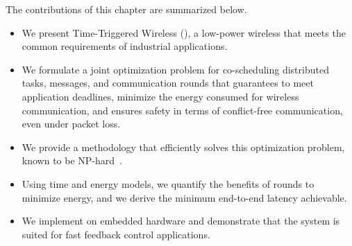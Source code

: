 The contributions of this chapter are summarized below.
\begin{itemize}

  \item
  We present Time-Triggered Wireless (\TTW), a low-power wireless \CPS that meets the common requirements of industrial applications.

  \item
  We formulate a joint optimization problem for co-scheduling distributed tasks, messages, and communication rounds that guarantees to meet application deadlines, minimize the energy consumed for wireless communication, and ensures safety in terms of conflict-free communication, even under packet loss.

  \item
  We provide a methodology that efficiently solves this optimization problem, known to be NP-hard~\cite{jeffay1991nonpreemptive}.

  \item
  Using time and energy models, we quantify the benefits of rounds to minimize energy, and we derive the minimum end-to-end latency achievable.

  \item
  We implement \TTW on embedded hardware and demonstrate that the system is suited for fast feedback control applications.

\end{itemize}
